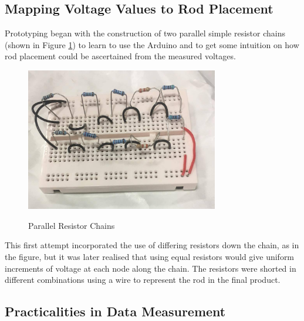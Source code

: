 \subsection{Mapping Voltage Values to Rod Placement}
Prototyping began with the construction of two parallel simple resistor chains (shown in Figure \ref{fig:simple_resistor}) to learn to use the Arduino and to get some intuition on how rod placement could be ascertained from the measured voltages. 

\begin{figure}
	\includegraphics[width=0.75\textwidth]{simple_resistor_chain.jpg}\\
    \centering
  	\caption{Parallel Resistor Chains}
    \centering
    \label{fig:simple_resistor}
\end{figure}

This first attempt incorporated the use of differing resistors down the chain, as in the figure, but it was later realised that using equal resistors would give uniform increments of voltage at each node along the chain. The resistors were shorted in different combinations using a wire to represent the rod in the final product.



\subsection{Practicalities in Data Measurement}


